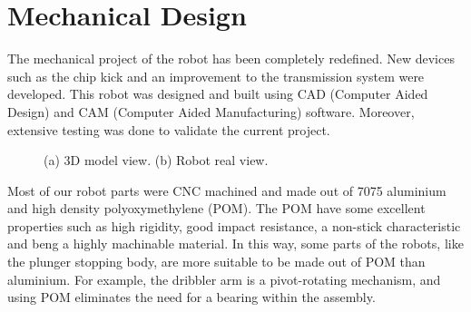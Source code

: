 \section{Mechanical Design}\label{mec_sec}

The mechanical project of the robot has been completely redefined. New devices such as the chip kick and an improvement to the transmission system were developed. This robot was designed and built using CAD (Computer Aided Design) and CAM (Computer Aided Manufacturing) software. Moreover, extensive testing was done to validate the current project.

\begin{figure}[thpb]
	\centering
	\caption{(a) 3D model view. (b) Robot real view.}
	\label{mec1}
\end{figure}

Most of our robot parts were CNC machined and made out of 7075 aluminium and high density polyoxymethylene (POM). The POM have some excellent properties such as high rigidity, good impact resistance,
a non-stick characteristic and beng a highly machinable material. In this way, some parts of the robots, like the plunger stopping body, are more suitable to be made out of POM than aluminium. For example, the dribbler arm is a pivot-rotating mechanism, and using POM eliminates the need for a bearing within the assembly.

